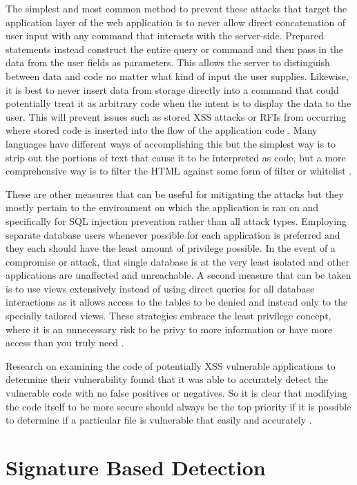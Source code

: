 The simplest and most common method to prevent these attacks that target the application layer of the web application is to never allow direct concatenation of user input with any command that interacts with the server-side.  Prepared statements instead construct the entire query or command and then pass in the data from the user fields as parameters.  This allows the server to distinguish between data and code no matter what kind of input the user supplies.  Likewise, it is best to never insert data from storage directly into a command that could potentially treat it as arbitrary code when the intent is to display the data to the user.  This will prevent issues such as stored XSS attacks or RFIs from occurring where stored code is inserted into the flow of the application code \cite{owaspSQLPrevention}.  Many languages have different ways of accomplishing this but the simplest way is to strip out the portions of text that cause it to be interpreted as code, but a more comprehensive way is to filter the HTML against some form of filter or whitelist \cite{htmlPurifier}.

These are other measures that can be useful for mitigating the attacks but they mostly pertain to the environment on which the application is ran on and specifically for SQL injection prevention rather than all attack types.  Employing separate database users whenever possible for each application is preferred and they each should have the least amount of privilege possible.  In the event of a compromise or attack, that single database is at the very least isolated and other applications are unaffected and unreachable.  A second measure that can be taken is to use views extensively instead of using direct queries for all database interactions as it allows access to the tables to be denied and instead only to the specially tailored views.  These strategies embrace the least privilege concept, where it is an unnecessary risk to be privy to more information or have more access than you truly need \cite{owaspSQLPrevention}.

Research on examining the code of potentially XSS vulnerable applications to determine their vulnerability found that it was able to accurately detect the vulnerable code with no false positives or negatives.  So it is clear that modifying the code itself to be more secure should always be the top priority if it is possible to determine if a particular file is vulnerable that easily and accurately \cite{xssdm}.

\section{Signature Based Detection} \label{sec:sigDetection}

